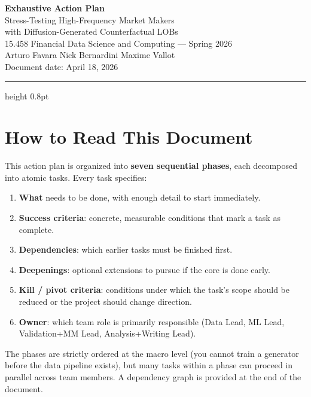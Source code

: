 \documentclass[11pt,a4paper]{article}
\begin{document}
\begin{center}
  {\LARGE\bfseries Exhaustive Action Plan}\\[6pt]
  {\Large Stress-Testing High-Frequency Market Makers\\
  with Diffusion-Generated Counterfactual LOBs}\\[10pt]
  {\large 15.458 Financial Data Science and Computing --- Spring 2026}\\[4pt]
  {\normalsize Arturo Favara \quad Nick Bernardini \quad Maxime Vallot}\\[4pt]
  {\small Document date: April 18, 2026}
\end{center}

\vspace{0.3cm}
\hrule height 0.8pt
\vspace{0.5cm}

\section*{How to Read This Document}

This action plan is organized into \textbf{seven sequential phases}, each decomposed into atomic tasks.
Every task specifies:

\begin{enumerate}[label=(\roman*)]
  \item \textbf{What} needs to be done, with enough detail to start immediately.
  \item \textbf{Success criteria}: concrete, measurable conditions that mark a task as complete.
  \item \textbf{Dependencies}: which earlier tasks must be finished first.
  \item \textbf{Deepenings}: optional extensions to pursue if the core is done early.
  \item \textbf{Kill / pivot criteria}: conditions under which the task's scope should be reduced or the project should change direction.
  \item \textbf{Owner}: which team role is primarily responsible (Data Lead, ML Lead, Validation+MM Lead, Analysis+Writing Lead).
\end{enumerate}

The phases are strictly ordered at the macro level (you cannot train a generator before the data pipeline exists), but many tasks within a phase can proceed in parallel across team members.
A dependency graph is provided at the end of the document.
\end{document}
